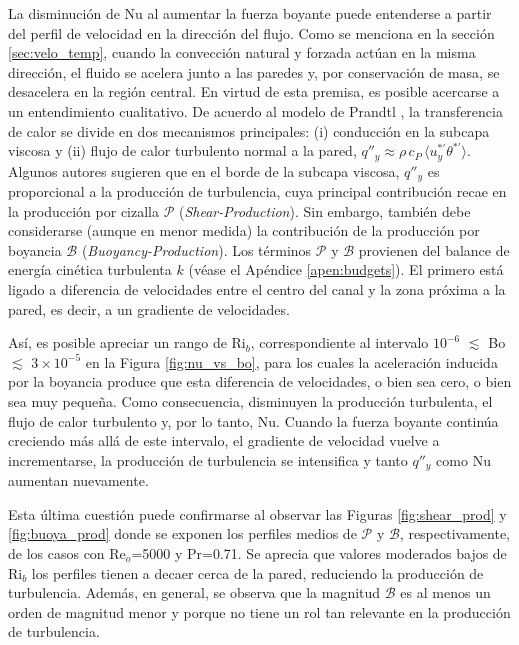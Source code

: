 La disminución de Nu al aumentar la fuerza boyante puede entenderse a partir del perfil de velocidad en la dirección del flujo. Como se menciona en la sección \ref{sec:velo_temp}, cuando la convección natural y forzada actúan en la misma dirección, el fluido se acelera junto a las paredes y, por conservación de masa, se desacelera en la región central. En virtud de esta premisa, es posible acercarse a un entendimiento cualitativo. De acuerdo al modelo de Prandtl \cite{Prandtl1942}, la transferencia de calor se divide en dos mecanismos principales: (i) conducción en la subcapa viscosa y (ii) flujo de calor turbulento normal a la pared, $q''_y \approx \rho \, c_P \, \langle u^{*'}_y \theta^{*'} \rangle$. Algunos autores \cite{aicher1997, hall1969laminarization} sugieren que en el borde de la subcapa viscosa,  $q''_y$ es proporcional a la producción de turbulencia, cuya principal contribución recae en la producción por cizalla $\mathcal{P}$ (\textit{Shear-Production}). Sin embargo, también debe considerarse (aunque en menor medida) la contribución de la producción por boyancia $\mathcal{B}$ (\textit{Buoyancy-Production}). Los términos $\mathcal{P}$ y $\mathcal{B}$ provienen del balance de energía cinética turbulenta $k$  (véase el Apéndice \ref{apen:budgets}). El primero está ligado a diferencia de velocidades entre el centro del canal y la zona próxima a la pared, es decir, a un gradiente de velocidades.

Así, es posible apreciar un rango de Ri$_b$, correspondiente al intervalo $10^{-6}$ $\lesssim$ Bo $\lesssim$ $3 \times 10^{-5}$ en la Figura \ref{fig:nu_vs_bo}, para los cuales la aceleración inducida por la boyancia produce que esta diferencia de velocidades, o bien sea cero, o bien sea muy pequeña. Como consecuencia, disminuyen la producción turbulenta, el flujo de calor turbulento y, por lo tanto, Nu. Cuando la fuerza boyante continúa creciendo más allá de este intervalo, el gradiente de velocidad vuelve a incrementarse, la producción de turbulencia se intensifica y tanto $q''_y$ como Nu aumentan nuevamente. 

Esta última cuestión puede confirmarse al observar las Figuras \ref{fig:shear_prod} y \ref{fig:buoya_prod} donde se exponen los perfiles medios de $\mathcal{P}$ y $\mathcal{B}$, respectivamente, de los casos con Re$_o$=5000 y Pr=0.71. Se aprecia que valores moderados bajos de Ri$_b$ los perfiles tienen a decaer cerca de la pared, reduciendo la producción de turbulencia. Además, en general, se observa que la magnitud $\mathcal{B}$ es al menos un orden de magnitud menor y porque no tiene un rol tan relevante en la producción de turbulencia.

